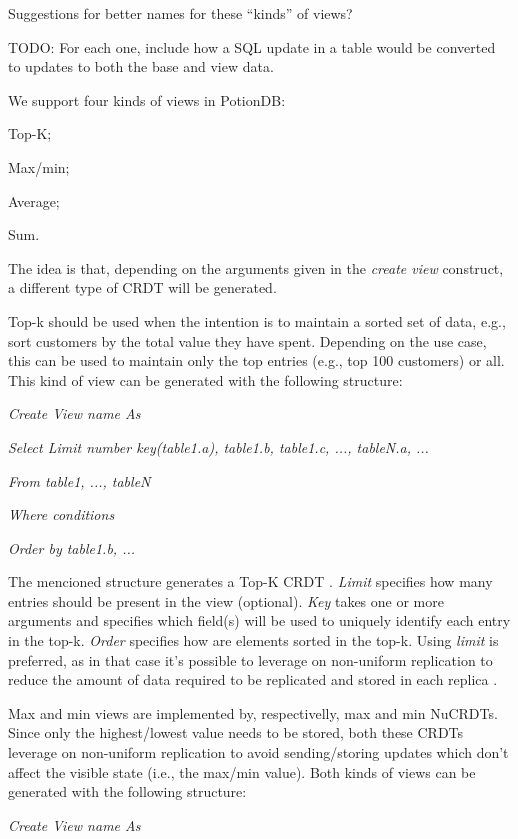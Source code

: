 \documentclass{vldb}
\newcommand{\grumbler}[2]{{\color{red}{\bf #1:} #2}}
\newcommand{\andre}[1]{\grumbler{andre}{#1}}
\newcommand{\emphvspace}{0.5\baselineskip}
\newcommand{\firstblockemph}[1]{\vspace{\emphvspace}\hspace{2em}\emph{#1}}
\newcommand{\middleblockemph}[1]{\hspace{2em}\emph{#1}}
\newcommand{\lastblockemph}[1]{\hspace{2em}\emph{#1}\vspace{\emphvspace}}
\begin{document}
\andre{Suggestions for better names for these ``kinds'' of views?}

\andre{TODO: For each one, include how a SQL update in a table would be converted to updates to both the base and view data.}

We support four kinds of views in PotionDB:
\begin{enumerate*}[label=(\roman*)]
	\item Top-K;
	\item Max/min;
	\item Average;
	\item Sum.
\end{enumerate*}
The idea is that, depending on the arguments given in the \emph{create view} construct, a different type of CRDT will be generated.

Top-k should be used when the intention is to maintain a sorted set of data, e.g., sort customers by the total value they have spent.
Depending on the use case, this can be used to maintain only the top entries (e.g., top 100 customers) or all.
This kind of view can be generated with the following structure:

\firstblockemph{Create View name As}

\middleblockemph{Select Limit number key(table1.a), table1.b, table1.c, ..., tableN.a, ...}

\middleblockemph{From table1, ..., tableN}

\middleblockemph{Where conditions}

\lastblockemph{Order by table1.b, ...}

The mencioned structure generates a Top-K CRDT \cite{???}.
\emph{Limit} specifies how many entries should be present in the view (optional). \emph{Key} takes one or more arguments and specifies which field(s) will be used to uniquely identify each entry in the top-k.
\emph{Order} specifies how are elements sorted in the top-k.
Using \emph{limit} is preferred, as in that case it's possible to leverage on non-uniform replication to reduce the amount of data required to be replicated and stored in each replica \cite{???}.

Max and min views are implemented by, respectivelly, max and min NuCRDTs.
Since only the highest/lowest value needs to be stored, both these CRDTs leverage on non-uniform replication to avoid sending/storing updates which don't affect the visible state (i.e., the max/min value).
Both kinds of views can be generated with the following structure:

\firstblockemph{Create View name As}
\end{document}

